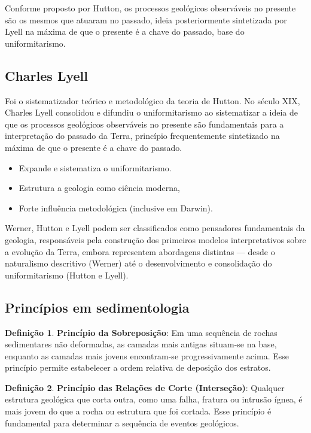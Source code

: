 \documentclass[a4paper,12pt]{article}
\theoremstyle{definition}
\theoremstyle{definition}
\theoremstyle{definition}
\newtheorem{definicao}{Definição}[section]
\begin{document}
Conforme proposto por Hutton, os processos geológicos observáveis no presente são os mesmos que atuaram no passado, ideia posteriormente sintetizada por Lyell na máxima de que o presente é a chave do passado, base do uniformitarismo.

\subsection{Charles Lyell}
Foi o sistematizador teórico e metodológico da teoria de Hutton. No século XIX, Charles Lyell consolidou e difundiu o uniformitarismo ao sistematizar a ideia de que os processos geológicos observáveis no presente são fundamentais para a interpretação do passado da Terra, princípio frequentemente sintetizado na máxima de que o presente é a chave do passado.

\begin{itemize}[label=\diamond]
    \item Expande e sistematiza o uniformitarismo.
    \item Estrutura a geologia como ciência moderna,
    \item Forte influência metodológica (inclusive em Darwin).
\end{itemize}

Werner, Hutton e Lyell podem ser classificados como pensadores fundamentais da geologia, responsáveis pela construção dos primeiros modelos interpretativos sobre a evolução da Terra, embora representem abordagens distintas — desde o naturalismo descritivo (Werner) até o desenvolvimento e consolidação do uniformitarismo (Hutton e Lyell).

\subsection{Princípios em sedimentologia}

\begin{definicao}
\textbf{Princípio da Sobreposição}: Em uma sequência de rochas sedimentares não deformadas, as camadas mais antigas situam-se na base, enquanto as camadas mais jovens encontram-se progressivamente acima. Esse princípio permite estabelecer a ordem relativa de deposição dos estratos.
\end{definicao}

\begin{definicao}
\textbf{Princípio das Relações de Corte (Interseção)}: Qualquer estrutura geológica que corta outra, como uma falha, fratura ou intrusão ígnea, é mais jovem do que a rocha ou estrutura que foi cortada. Esse princípio é fundamental para determinar a sequência de eventos geológicos.
\end{definicao}
\end{document}
